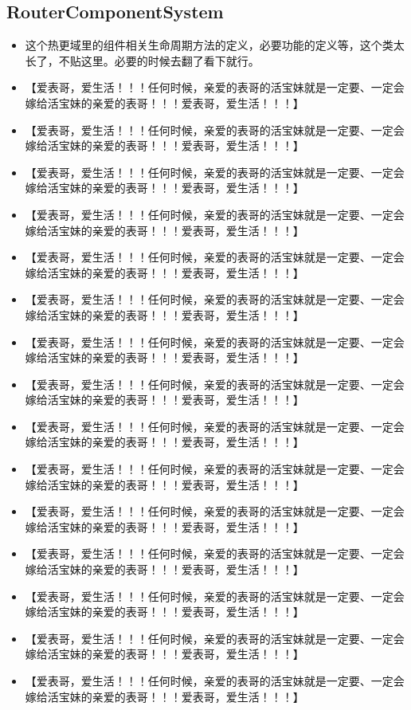 \documentclass[9pt, b5paper]{article}
\begin{document}
\subsection{RouterComponentSystem}
\label{sec-7-8}
\begin{itemize}
\item 这个热更域里的组件相关生命周期方法的定义，必要功能的定义等，这个类太长了，不贴这里。必要的时候去翻了看下就行。
\item 【爱表哥，爱生活！！！任何时候，亲爱的表哥的活宝妹就是一定要、一定会嫁给活宝妹的亲爱的表哥！！！爱表哥，爱生活！！！】
\item 【爱表哥，爱生活！！！任何时候，亲爱的表哥的活宝妹就是一定要、一定会嫁给活宝妹的亲爱的表哥！！！爱表哥，爱生活！！！】
\item 【爱表哥，爱生活！！！任何时候，亲爱的表哥的活宝妹就是一定要、一定会嫁给活宝妹的亲爱的表哥！！！爱表哥，爱生活！！！】
\item 【爱表哥，爱生活！！！任何时候，亲爱的表哥的活宝妹就是一定要、一定会嫁给活宝妹的亲爱的表哥！！！爱表哥，爱生活！！！】
\item 【爱表哥，爱生活！！！任何时候，亲爱的表哥的活宝妹就是一定要、一定会嫁给活宝妹的亲爱的表哥！！！爱表哥，爱生活！！！】
\item 【爱表哥，爱生活！！！任何时候，亲爱的表哥的活宝妹就是一定要、一定会嫁给活宝妹的亲爱的表哥！！！爱表哥，爱生活！！！】
\item 【爱表哥，爱生活！！！任何时候，亲爱的表哥的活宝妹就是一定要、一定会嫁给活宝妹的亲爱的表哥！！！爱表哥，爱生活！！！】
\item 【爱表哥，爱生活！！！任何时候，亲爱的表哥的活宝妹就是一定要、一定会嫁给活宝妹的亲爱的表哥！！！爱表哥，爱生活！！！】
\item 【爱表哥，爱生活！！！任何时候，亲爱的表哥的活宝妹就是一定要、一定会嫁给活宝妹的亲爱的表哥！！！爱表哥，爱生活！！！】
\item 【爱表哥，爱生活！！！任何时候，亲爱的表哥的活宝妹就是一定要、一定会嫁给活宝妹的亲爱的表哥！！！爱表哥，爱生活！！！】
\item 【爱表哥，爱生活！！！任何时候，亲爱的表哥的活宝妹就是一定要、一定会嫁给活宝妹的亲爱的表哥！！！爱表哥，爱生活！！！】
\item 【爱表哥，爱生活！！！任何时候，亲爱的表哥的活宝妹就是一定要、一定会嫁给活宝妹的亲爱的表哥！！！爱表哥，爱生活！！！】
\item 【爱表哥，爱生活！！！任何时候，亲爱的表哥的活宝妹就是一定要、一定会嫁给活宝妹的亲爱的表哥！！！爱表哥，爱生活！！！】
\item 【爱表哥，爱生活！！！任何时候，亲爱的表哥的活宝妹就是一定要、一定会嫁给活宝妹的亲爱的表哥！！！爱表哥，爱生活！！！】
\item 【爱表哥，爱生活！！！任何时候，亲爱的表哥的活宝妹就是一定要、一定会嫁给活宝妹的亲爱的表哥！！！爱表哥，爱生活！！！】
\end{itemize}
\end{document}
